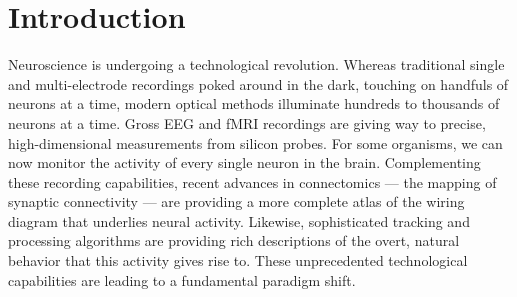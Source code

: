 \chapter{Introduction}
\label{chap:one}


Neuroscience is undergoing a technological revolution.
Whereas traditional single and multi-electrode recordings
poked around in the dark, touching on handfuls of neurons
at a time, modern optical methods illuminate hundreds to
thousands of neurons at a time.
Gross EEG and fMRI recordings are giving way to precise,
high-dimensional measurements from silicon probes.
For some organisms, we can now monitor the activity
of every single neuron in the brain.
Complementing these recording capabilities, recent advances in connectomics --- the
mapping of synaptic connectivity --- are providing a
more complete atlas of the wiring diagram that underlies neural
activity.  Likewise, sophisticated tracking and processing algorithms
are providing rich descriptions of the overt, natural behavior that
this activity gives rise to.  These unprecedented technological
capabilities are leading to a fundamental paradigm shift.


